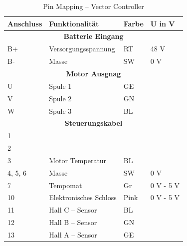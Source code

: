 \begin{table}[!ht]
	\centering
	\caption{Pin Mapping – Vector Controller}
	\label{Vector_Controller:tab:pinmapping}
	\begin{tabular}{lll|l}
		\hline
		\textbf{Anschluss}           & \textbf{Funktionalität} & \textbf{Farbe} & \textbf{U in V} \\ \hline
		\multicolumn{4}{c}{\textbf{Batterie Eingang}}                                             \\ \hline
		\multicolumn{1}{l|}{B+}      & Versorgungsspannung     & RT             & 48 V            \\
		\multicolumn{1}{l|}{B-}      & Masse                   & SW             & 0 V             \\ \hline
		\multicolumn{4}{c}{\textbf{Motor Ausgnag}}                                                \\ \hline
		\multicolumn{1}{l|}{U}       & Spule 1                 & GE             &                 \\
		\multicolumn{1}{l|}{V}       & Spule 2                 & GN             &                 \\
		\multicolumn{1}{l|}{W}       & Spule 3                 & BL             &                 \\ \hline
		\multicolumn{4}{c}{\textbf{Steuerungskabel}}                                              \\ \hline
		\multicolumn{1}{l|}{1}       &                         &                &                 \\
		\multicolumn{1}{l|}{2}       &                         &                &                 \\
		\multicolumn{1}{l|}{3}       & Motor Temperatur        & BL             &                 \\
		\multicolumn{1}{l|}{4, 5, 6} & Masse                   & SW             & 0 V             \\
		\multicolumn{1}{l|}{7}       & Tempomat                & Gr             & 0 V - 5 V       \\
		\multicolumn{1}{l|}{10}      & Elektronisches Schloss  & Pink           & 0 V - 5 V       \\
		\multicolumn{1}{l|}{11}      & Hall C – Sensor         & BL             &                 \\
		\multicolumn{1}{l|}{12}      & Hall B – Sensor         & GN             &                 \\
		\multicolumn{1}{l|}{13}      & Hall A – Sensor         & GE             &                 \\

\end{tabular}
\end{table}
